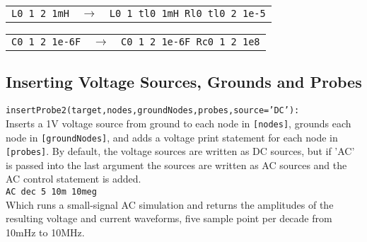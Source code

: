 \begin{tabular}{ c c  p{3cm} }
\texttt{L0 1 2 1mH} & $\rightarrow$ & \texttt{L0 1 tl0 1mH Rl0 tl0 2 1e-5} \\
\end{tabular}
\begin{tabular}{ |c  c  p{3cm} }
\texttt{C0 1 2 1e-6F} & $\rightarrow$ & \texttt{C0 1 2 1e-6F Rc0 1 2 1e8} \\
\end{tabular}

\subsection{Inserting Voltage Sources, Grounds and Probes}
\texttt{insertProbe2(target,nodes,groundNodes,probes,source='DC'):}\\
Inserts a 1V voltage source from ground to each node in \texttt{[nodes]}, grounds each node in \texttt{[groundNodes]}, and adds a voltage print statement for each node in \texttt{[probes]}.
By default, the voltage sources are written as DC sources, but if 'AC' is passed into the last argument the sources are written as AC sources and the AC control statement is added.\\
\texttt{AC dec 5 10m 10meg}\\
Which runs a small-signal AC simulation and returns the amplitudes of the resulting voltage and current waveforms, five sample point per decade from 10mHz to 10MHz.

